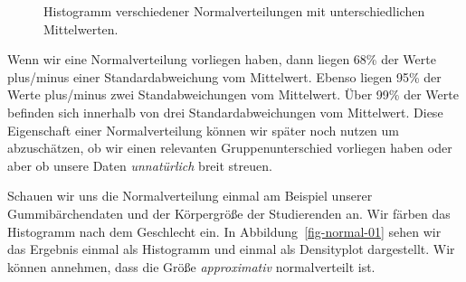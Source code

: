 \documentclass[
  letterpaper,
]{scrbook}
\begin{document}
\begin{figure}
\begin{minipage}[t]{0.50\linewidth}
{{}

}

\end{minipage}%

\caption{\label{fig-normal-02}Histogramm verschiedener
Normalverteilungen mit unterschiedlichen Mittelwerten.}

\end{figure}

{}

Wenn wir eine Normalverteilung vorliegen haben, dann liegen 68\% der
Werte plus/minus einer Standardabweichung vom Mittelwert. Ebenso liegen
95\% der Werte plus/minus zwei Standabweichungen vom Mittelwert. Über
99\% der Werte befinden sich innerhalb von drei Standardabweichungen vom
Mittelwert. Diese Eigenschaft einer Normalverteilung können wir später
noch nutzen um abzuschätzen, ob wir einen relevanten Gruppenunterschied
vorliegen haben oder aber ob unsere Daten \emph{unnatürlich} breit
streuen.

{}

Schauen wir uns die Normalverteilung einmal am Beispiel unserer
Gummibärchendaten und der Körpergröße der Studierenden an. Wir färben
das Histogramm nach dem Geschlecht ein. In Abbildung~\ref{fig-normal-01}
sehen wir das Ergebnis einmal als Histogramm und einmal als Densityplot
dargestellt. Wir können annehmen, dass die Größe \emph{approximativ}
normalverteilt ist.
\end{document}
